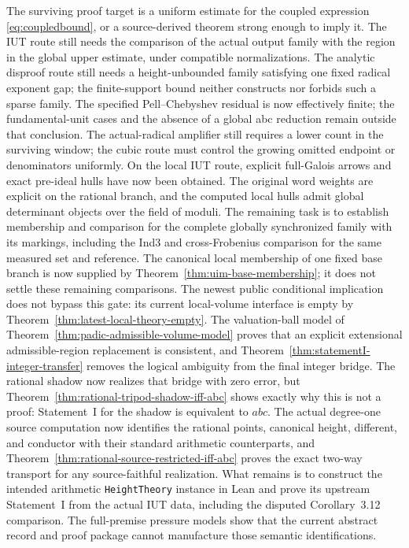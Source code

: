\documentclass[11pt]{amsart}
\theoremstyle{definition}
\theoremstyle{remark}
\begin{document}
The surviving proof target is a uniform estimate for the coupled expression
\eqref{eq:coupledbound}, or a source-derived theorem strong enough to imply
it. The IUT route still needs the comparison of the actual output family
with the region in the global upper estimate, under compatible
normalizations. The analytic disproof route still
needs a height-unbounded family satisfying one fixed radical exponent gap;
the finite-support bound neither constructs nor forbids such a sparse
family. The specified Pell--Chebyshev residual is now effectively finite;
the fundamental-unit cases and the absence of a global abc reduction remain
outside that conclusion. The actual-radical amplifier still requires a
lower count in the surviving window; the cubic route must control the
growing omitted endpoint or denominators uniformly. On the local IUT
route, explicit full-Galois arrows and exact pre-ideal hulls have now
been obtained. The original word weights are explicit on the rational
branch, and the computed local hulls admit global determinant objects
over the field of moduli. The remaining task is to establish membership
and comparison for the complete globally synchronized family with its
markings, including the Ind3 and cross-Frobenius comparison for the
same measured set and reference. The canonical local membership of
one fixed base branch is now supplied by
Theorem~\ref{thm:uim-base-membership}; it does not settle these
remaining comparisons.
The newest public conditional implication does not bypass this gate: its
current local-volume interface is empty by
Theorem~\ref{thm:latest-local-theory-empty}.  The valuation-ball model of
Theorem~\ref{thm:padic-admissible-volume-model} proves that an explicit
extensional admissible-region replacement is consistent, and
Theorem~\ref{thm:statementI-integer-transfer} removes the logical ambiguity
from the final integer bridge.  The rational shadow now realizes that bridge
with zero error, but
Theorem~\ref{thm:rational-tripod-shadow-iff-abc} shows exactly why this is not
a proof: Statement~I for the shadow is equivalent to $abc$.  The actual
degree-one source computation now identifies the rational points, canonical
height, different, and conductor with their standard arithmetic counterparts,
and Theorem~\ref{thm:rational-source-restricted-iff-abc} proves the exact
two-way transport for any source-faithful realization.  What remains is to
construct the intended arithmetic \texttt{HeightTheory} instance in Lean and
prove its upstream Statement~I from the actual IUT data, including the disputed
Corollary~3.12 comparison.  The full-premise pressure models show that the
current abstract record and proof package cannot manufacture those semantic
identifications.
\end{document}
